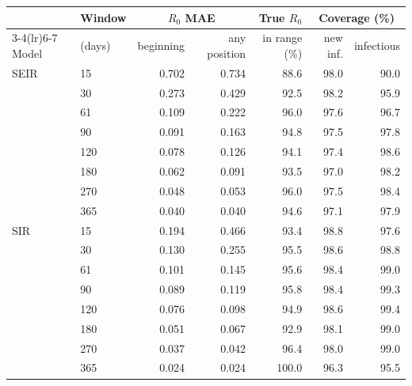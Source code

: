 \begin{tabular}{llrrrrr}
\toprule
 & Window & \multicolumn{2}{c}{$R_0$ MAE} & True $R_0$ & \multicolumn{2}{c}{Coverage (\%)} \\
\cmidrule(lr){3-4}\cmidrule(lr){6-7}
Model & (days) & beginning & any position & in range (\%) & new inf. & infectious \\
\midrule
SEIR & 15 & 0.702 & 0.734 & 88.6 & 98.0 & 90.0 \\
 & 30 & 0.273 & 0.429 & 92.5 & 98.2 & 95.9 \\
 & 61 & 0.109 & 0.222 & 96.0 & 97.6 & 96.7 \\
 & 90 & 0.091 & 0.163 & 94.8 & 97.5 & 97.8 \\
 & 120 & 0.078 & 0.126 & 94.1 & 97.4 & 98.6 \\
 & 180 & 0.062 & 0.091 & 93.5 & 97.0 & 98.2 \\
 & 270 & 0.048 & 0.053 & 96.0 & 97.5 & 98.4 \\
 & 365 & 0.040 & 0.040 & 94.6 & 97.1 & 97.9 \\
\midrule
SIR & 15 & 0.194 & 0.466 & 93.4 & 98.8 & 97.6 \\
 & 30 & 0.130 & 0.255 & 95.5 & 98.6 & 98.8 \\
 & 61 & 0.101 & 0.145 & 95.6 & 98.4 & 99.0 \\
 & 90 & 0.089 & 0.119 & 95.8 & 98.4 & 99.3 \\
 & 120 & 0.076 & 0.098 & 94.9 & 98.6 & 99.4 \\
 & 180 & 0.051 & 0.067 & 92.9 & 98.1 & 99.0 \\
 & 270 & 0.037 & 0.042 & 96.4 & 98.0 & 99.0 \\
 & 365 & 0.024 & 0.024 & 100.0 & 96.3 & 95.5 \\
\bottomrule
\end{tabular}
